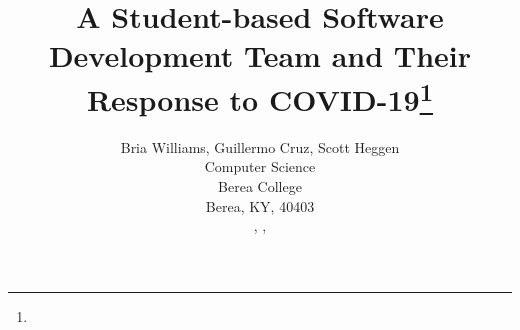\documentclass{article}
\title{A Student-based Software Development Team and Their Response to COVID-19\footnote{\protect}}
\author{
Bria Williams, Guillermo Cruz, Scott Heggen\\
Computer Science\\
Berea College\\
Berea, KY, 40403\\
\email{williamsbri@bereaalumni.org}, \email{cruzg@berea.edu}, \email{heggens@berea.edu}\\
}
\begin{document}
\maketitle

\begin{abstract}
 
\end{abstract}


% 





\medskip



\end{document}
